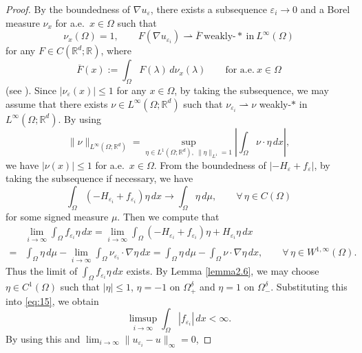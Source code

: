 \documentclass{amsart}
\theoremstyle{definition}
\def\R{{\mathbb{R}}}
\begin{document}
\begin{proof}
By the boundedness of $\nabla u_\varepsilon$, there exists a subsequence $\varepsilon _i \to 0$ and a Borel measure $\nu_x$ for a.e.\ $x \in \Omega$ such that
\begin{equation}\label{young1}
\nu_x (\Omega)=1, \qquad F (\nabla u_{\varepsilon _i}) \rightharpoonup \overline{F} \ 
\text{weakly-}\ast \ \text{in} \ L^\infty (\Omega)
\end{equation}
for any $F \in C(\mathbb{R}^d ; \R)$, where
\begin{equation}\label{young2}
\overline{F} (x):= \int_{\Omega} F(\lambda) \,d\nu _x (\lambda) \qquad \text{for a.e.} \ x \in \Omega
\end{equation}
(see \cite[Theorem 11]{MR1034481}).
Since $|\nu _\varepsilon (x)| \leq 1$ for any $x \in \Omega$, by taking the subsequence, 
we may assume that there exists $\nu \in L^\infty (\Omega; \R^d)$ such that $\nu_{\varepsilon_i} \rightharpoonup \nu$ weakly-$\ast$ in $L^\infty (\Omega; \R^d)$. By using
\[
\| \nu \|_{L^\infty (\Omega; \R^d)} = \sup_{\eta \in L^1 (\Omega; \R^d), \ \| \eta \|_{L^1}=1} 
\left| \int_{\Omega} \nu \cdot \eta \, dx \right|,
\]
we have $|\nu (x)| \leq 1$ for a.e.\ $x \in \Omega$.
From the boundedness of $|- H_\varepsilon +f_\varepsilon|$, by taking the subsequence if necessary, we have
\[
\int_{\Omega} (-H_{\varepsilon_i}  + f_{\varepsilon_i} ) \eta \, dx 
\to \int_{\Omega} \eta \, d\mu,
\qquad \forall \, \eta \in C(\Omega)
\]
for some signed measure $\mu$.
Then we compute that
\begin{equation}\label{eq:15}
\begin{split}
&\lim_{i\to \infty} \int_\Omega f_{\varepsilon _i}  \eta \, dx
= \lim_{i\to \infty} \int_{\Omega} (-H_{\varepsilon_i} + f_{\varepsilon _i} ) \eta
+ H_{\varepsilon _i} \eta \, dx \\
=&  \int_{\Omega} \eta \, d\mu - \lim_{i\to \infty} \int_\Omega \nu _{\varepsilon_i} \cdot \nabla \eta \, dx
=\int_{\Omega} \eta \, d\mu 
- \int_\Omega \nu \cdot \nabla \eta \, dx,\qquad \forall \, \eta \in W^{1,\infty} (\Omega).
\end{split}
\end{equation}
Thus the limit of $\int_\Omega f_{\varepsilon _i} \eta \, dx$ exists.
By Lemma \ref{lemma2.6}, we may choose $\eta \in C^1 (\Omega)$ such that $|\eta|\leq 1$, $\eta = -1$ on $\Omega_+ ^\delta$
and $\eta = 1$ on $\Omega_- ^\delta$. Substituting this into \eqref{eq:15}, we obtain
\[
\limsup_{i\to \infty} \int_{\Omega} |f_{\varepsilon_i}|\, dx<\infty.
\]
By using this and $\lim_{i\to \infty}\|u_{\varepsilon_i} -u\|_\infty =0$, 

\end{proof}
\end{document}
